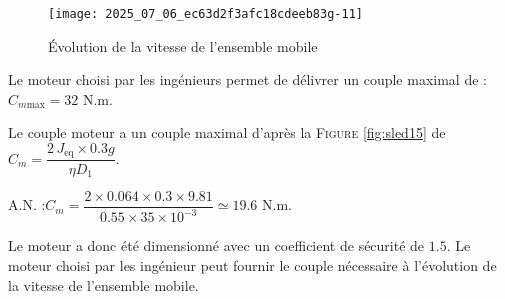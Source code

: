 \ifprof
\begin{corrige}
%

\end{corrige}
\else
\fi


\ifprof
\else


\begin{figure}[!h]
\centering
\texttt{[image: 2025\_07\_06\_ec63d2f3afc18cdeeb83g-11]}

\caption{\label{ccs_mp_2022_fig_15}Évolution de la vitesse de l'ensemble mobile}
\end{figure}
\fi

\ifprof
\begin{corrige}
Le moteur choisi par les ingénieurs permet de délivrer un couple maximal de : $C_{m\text{max}} = 32$ N.m.

Le couple moteur a un couple maximal d'après la \textsc{Figure} \ref{fig:sled15} de $C_m = \dfrac{2 \, J_\text{eq} \times 0.3 g}{\eta D_1}$.

A.N. :$ C_m = \dfrac{2 \times 0.064 \times 0.3 \times 9.81}{0.55 \times 35 \times 10^{-3}} \simeq 19.6 \text{ N.m}$.

Le moteur a donc été dimensionné avec un coefficient de sécurité de $1.5$. Le moteur choisi par les ingénieur peut fournir le couple nécessaire à l'évolution de la vitesse de l'ensemble mobile.
\end{corrige}
\else
\fi


